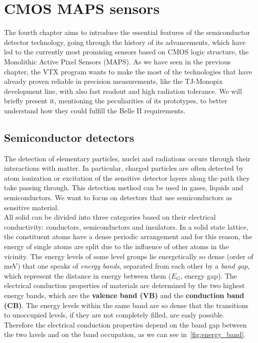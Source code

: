 \chapter{CMOS MAPS sensors} \label{ch:CMOS}

The fourth chapter aims to introduce the essential features of the semiconductor detector technology, going through the history of its advancements, which have led to the currently most promising sensors based on CMOS logic structure, the Monolithic Active Pixel Sensors (MAPS). As we have seen in the previous chapter, the VTX program wants to make the most of the technologies that have already proven reliable in precision measurements, like the TJ-Monopix development line, with also fast readout and high radiation tolerance. We will briefly present it, mentioning the peculiarities of its prototypes, to better understand how they could fulfill the Belle II requirements.


\section{Semiconductor detectors} 


The detection of elementary particles, nuclei and radiations occurs through their interactions with matter. In particular, charged particles are often detected by atom ionization or excitation of the sensitive detector layers along the path they take passing through. This detection method can be used in gases, liquids and semiconductors. We want to focus on detectors that use semiconductors as sensitive material. \\

All solid can be divided into three categories based on their electrical conductivity: conductors, semiconductors and insulators. 
In a solid state lattice, the constituent atoms have a dense periodic arrangement and for this reason, the energy of single atoms are split due to the influence of other atoms in the vicinity. The energy levels of some level groups lie energetically so dense (order of meV) that one speaks of \emph{energy bands}, separated from each other by a \emph{band gap}, which represent the distance in energy between them (\textbf{$E_{G}$}, energy gap). The electrical conduction properties of materials are determined by the two highest energy bands, which are the \textbf{valence band (VB)} and the \textbf{conduction band (CB)}. The energy levels within the same band are so dense that the transitions to unoccupied levels, if they are not completely filled, are easly possible. Therefore the electrical conduction properties depend on the band gap between the two lavels and on the band occupation, as we can see in~\autoref{fig:energy_band}.

